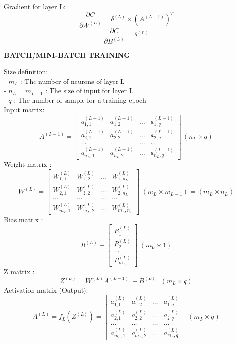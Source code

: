\documentclass{article}
\begin{document}
    Gradient for layer L:
    \[
        \frac{\partial C}{\partial W^{(L)}} = \delta^{(L)} \times \left(A^{(L-1)}\right)^T
    \]
    \[
        \frac{\partial C}{\partial B^{(L)}} = \delta^{(L)}
    \]
    \begin{center}
        {\Large \textbf{BATCH/MINI-BATCH TRAINING}}
    \end{center}
    Size definition: \\
    - $m_L$ : The number of neurons of layer L \\
    - $n_L = m_{L-1}$ : The size of input for layer L \\
    - $q$ : The number of sample for a training epoch \\
    Input matrix: 
    \[
        A^{(L-1)} = 
        \begin{bmatrix}
            a^{(L-1)}_{1, 1} & a^{(L-1)}_{1, 2} & \hdots & a^{(L-1)}_{1, q} \\
            a^{(L-1)}_{2, 1} & a^{(L-1)}_{2, 2} & \hdots & a^{(L-1)}_{2, q} \\
            \hdots & \hdots & \hdots & \hdots \\
            a^{(L-1)}_{n_L, 1} & a^{(L-1)}_{n_L, 2} & \hdots & a^{(L-1)}_{n_L, q}
        \end{bmatrix} \ (n_L \times q) 
    \]
    Weight matrix : 
    \[
        W^{(L)} = 
        \begin{bmatrix}
            W^{(L)}_{1, 1} & W^{(L)}_{1, 2} & \hdots & W^{(L)}_{1, n_L} \\
            W^{(L)}_{2, 1} & W^{(L)}_{2, 2} & \hdots & W^{(L)}_{2, n_L} \\
            \hdots & \hdots & \hdots & \hdots \\
            W^{(L)}_{m_L, 1} & W^{(L)}_{m_L, 2} & \hdots & W^{(L)}_{m_L, n_L} 
        \end{bmatrix} \ (m_L \times m_{L-1}) = (m_L \times n_L)
    \]
    Bias matrix : 
    \[
        B^{(L)} = 
        \begin{bmatrix}
            B^{(L)}_1  \\ B^{(L)}_2 \\ \hdots \\ B^{(L)}_{m_L} 
        \end{bmatrix} \ (m_L \times 1)
    \]
    Z matrix : 
    \[
        Z^{(L)} = W^{(L)}A^{(L-1)}\ + B^{(L)} \ \ \ (m_L \times q)
    \]
    Activation matrix (Output): 
    \[
        A^{(L)} = f_L\left(Z^{(L)}\right) = 
        \begin{bmatrix}
            a^{(L)}_{1, 1} & a^{(L)}_{1, 2} & \hdots & a^{(L)}_{1, q} \\
            a^{(L)}_{2, 1} & a^{(L)}_{2, 2} & \hdots & a^{(L)}_{2, q} \\
            \hdots & \hdots & \hdots & \hdots \\
            a^{(L)}_{m_L, 1} & a^{(L)}_{m_L, 2} & \hdots & a^{(L)}_{m_L, q}
        \end{bmatrix} \ (m_L \times q) 
    \]
\end{document}
